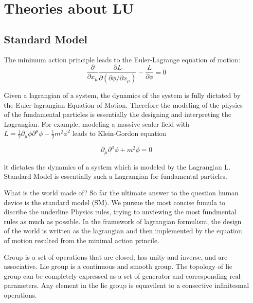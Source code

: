 
\section{Theories about LU}
\label{sec:relatedworks:theories}


\subsection{Standard Model}

The minimum action principle leads to the Euler-Lagrange equation of motion:
\begin{equation}
    \frac{\partial}{\partial x_\mu} \frac{\partial L}{\partial(\partial \phi / \partial x_\mu)} - \frac{L}{\partial \phi} = 0
\end{equation}

Given a lagrangian of a system, the dynamics of the system is fully dictated by the Euler-lagrangian Equation of Motion. Therefore the modeling of the physics of the fundamental particles is essentially the designing and interpreting the Lagrangian. For example, modeling a massive scaler field with $L=\frac{1}{2} \partial_\mu\phi \partial^\mu \phi - \frac{1}{2} m^2 \phi^2$ leads to Klein-Gordon equation

\begin{equation}
    \partial_\mu \partial^\mu \phi + m^2 \phi = 0
\end{equation}



it dictates the dynamics of a system which is modeled by the Lagrangian L. Standard Model is essentially such a Lagrangian for fundamental particles.



What is the world made of? So far the ultimate answer to the question human device is the standard model (SM). We pursue the most concise fumula to discribe the underline Physics rules, trying to unviewing the most fundmental rules as much as possible. In the framework of lagrangian formulism, the design of the world is written as the lagrangian and then implemented by the equation of motion resulted from the minimal action princile. 


Group is a set of operations that are closed, has unity and inverse, and are associative. Lie group is a continuous and smooth group.  The topology of lie group can be completely expressed as a set of generator and corresponding real parameters. Any element in the lie group is equavilent to a consective infinitesmal operations.

